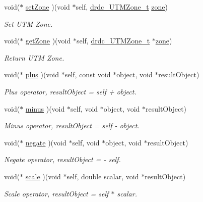 \begin{CompactItemize}
void($\ast$ \hyperlink{structdrdc__WUTMPosn__t_4b94b8f02165069e28d21375a2dda7df}{setZone} )(void $\ast$self, \hyperlink{structdrdc__UTMZone__t}{drdc\_\-UTMZone\_\-t} \hyperlink{structdrdc__WUTMPosn__t_932192c6467a673d6537e77421bdbb09}{zone})
\begin{CompactList}\small\item\em Set UTM Zone. \item\end{CompactList}\item 
void($\ast$ \hyperlink{structdrdc__WUTMPosn__t_391cac345775ffc92734126d33ddbc63}{getZone} )(void $\ast$self, \hyperlink{structdrdc__UTMZone__t}{drdc\_\-UTMZone\_\-t} $\ast$\hyperlink{structdrdc__WUTMPosn__t_932192c6467a673d6537e77421bdbb09}{zone})
\begin{CompactList}\small\item\em Return UTM Zone. \item\end{CompactList}\item 
void($\ast$ \hyperlink{structdrdc__WUTMPosn__t_eaf4db1b5ceb35b7f4adb96973cd84fb}{plus} )(void $\ast$self, const void $\ast$object, void $\ast$resultObject)
\begin{CompactList}\small\item\em Plus operator, resultObject = self + object. \item\end{CompactList}\item 
void($\ast$ \hyperlink{structdrdc__WUTMPosn__t_954f69b19638b4636527e3e3586c3335}{minus} )(void $\ast$self, void $\ast$object, void $\ast$resultObject)
\begin{CompactList}\small\item\em Minus operator, resultObject = self - object. \item\end{CompactList}\item 
void($\ast$ \hyperlink{structdrdc__WUTMPosn__t_597ecc0b559b3a8ce183403149e56fd1}{negate} )(void $\ast$self, void $\ast$object, void $\ast$resultObject)
\begin{CompactList}\small\item\em Negate operator, resultObject = - self. \item\end{CompactList}\item 
void($\ast$ \hyperlink{structdrdc__WUTMPosn__t_e7c9b83d1c882ef805af39242a160d2b}{scale} )(void $\ast$self, double scalar, void $\ast$resultObject)
\begin{CompactList}\small\item\em Scale operator, resultObject = self $\ast$ scalar. \item\end{CompactList}\item 

\end{CompactItemize}

